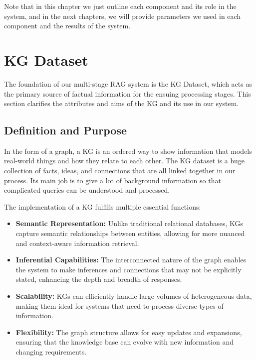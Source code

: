 Note that in this chapter we just outline each component and its role in the system, and in the next chapters, we will provide parameters we used in each component and the results of the system.

\section{\ac{KG} Dataset}\label{sec:knowledge-graph-dataset}
The foundation of our multi-stage RAG system is the \ac{KG} Dataset, which acts as the primary source of factual information for the ensuing processing stages.
This section clarifies the attributes and aims of the \ac{KG} and its use in our system.

\subsection{Definition and Purpose}\label{subsec:definition-and-purpose}
In the form of a graph, a \ac{KG} is an ordered way to show information that models real-world things and how they relate to each other.
The \ac{KG} dataset is a huge collection of facts, ideas, and connections that are all linked together in our process.
Its main job is to give a lot of background information so that complicated queries can be understood and processed.

The implementation of a \ac{KG} fulfills multiple essential functions:
\begin{itemize}
    \item \textbf{Semantic Representation:} Unlike traditional relational databases, \acp{KG} capture semantic relationships between entities, allowing for more nuanced and context-aware information retrieval.
    \item \textbf{Inferential Capabilities:} The interconnected nature of the graph enables the system to make inferences and connections that may not be explicitly stated, enhancing the depth and breadth of responses.
    \item \textbf{Scalability:} \acp{KG} can efficiently handle large volumes of heterogeneous data, making them ideal for systems that need to process diverse types of information.
    \item \textbf{Flexibility:} The graph structure allows for easy updates and expansions, ensuring that the knowledge base can evolve with new information and changing requirements.
\end{itemize}


